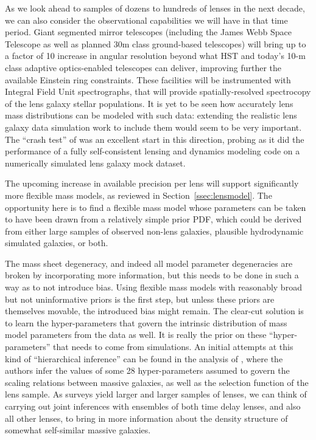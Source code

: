 As we look ahead to samples of dozens to hundreds of lenses in the
next decade, we can also consider the observational capabilities we
will have in that time period. Giant segmented mirror telescopes
(including the James Webb Space Telescope as well as planned 30m class
ground-based telescopes) will bring up to a factor of 10 increase in
angular resolution beyond what HST and today's 10-m class adaptive
optics-enabled telescopes can deliver, improving further the available
Einstein ring constraints. These facilities will be instrumented with
Integral Field Unit spectrographs, that will provide
spatially-resolved spectrocopy of the lens galaxy stellar populations.
It is yet to be seen how accurately lens mass distributions can be
modeled with such data: extending the realistic lens galaxy data
simulation work to include them would seem to be very important. The
``crash test'' of \citet{Bar++09a} was an excellent start in this
direction, probing as it did the performance of a fully self-consistent
lensing and dynamics modeling code on a numerically simulated lens
galaxy mock dataset.

The upcoming increase in available precision per lens will support
significantly more flexible mass models, as reviewed in
Section~\ref{ssec:lensmodel}.
The opportunity here is to find a flexible mass model whose parameters
can be taken to have been drawn from a relatively simple prior PDF,
which could be derived from either large samples of observed non-lens
galaxies, plausible hydrodynamic simulated galaxies, or both.


The mass sheet degeneracy, and indeed all model parameter degeneracies
are broken by incorporating more information, but this needs to be
done in such a way as to not introduce bias. Using flexible mass
models with reasonably broad but not uninformative priors is the first
step, but unless these priors are themselves movable, the introduced
bias might remain. The clear-cut solution is to learn the
hyper-parameters that govern the intrinsic distribution of mass model
parameters from the data as well. It is really the prior on these
``hyper-parameters'' that needs to come from simulations. An initial
attempts at this kind of ``hierarchical inference'' can be found in
the analysis of \citet{SonnenfeldEtal2015}, where the authors infer
the values of some 28 hyper-parameters assumed to govern the scaling
relations between massive galaxies, as well as the selection function
of the lens sample. As surveys yield larger and larger samples of
lenses, we can think of carrying out joint inferences with ensembles
of both time delay lenses, and also all other lenses, to bring in more
information about the density structure of somewhat self-similar
massive galaxies.

